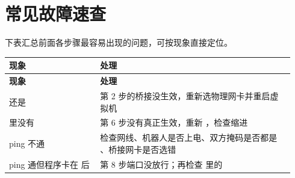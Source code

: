 \chapter{常见故障速查}
\label{app:troubleshooting}
下表汇总前面各步骤最容易出现的问题，可按现象直接定位。

\begin{longtable}{@{}P{0.30\linewidth}P{0.64\linewidth}@{}}
\toprule
\textbf{现象} & \textbf{处理} \\
\midrule
\endfirsthead
\toprule
\textbf{现象} & \textbf{处理} \\
\midrule
\endhead
\bottomrule
\endfoot
{} 还是  & 第 2 步的桥接没生效，重新选物理网卡并重启虚拟机 \\
 里没有  & 第 6 步没有真正生效，重新 ，检查缩进 \\
ping 不通 & 检查网线、机器人是否上电、双方掩码是否都是 、桥接网卡是否选错 \\
ping 通但程序卡在  后 & 第 8 步端口没放行；再检查  里的  \\
\end{longtable}
